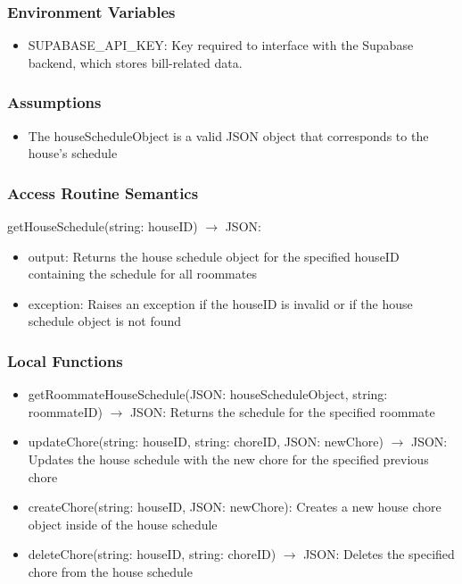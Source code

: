 \documentclass[12pt, titlepage]{article}
\begin{document}
\subsubsection{Environment Variables}
\begin{itemize}
  \item SUPABASE{\_}API{\_}KEY: Key required to interface with the Supabase backend, which stores bill-related data.
  \end{itemize}
  
\subsubsection{Assumptions}

\begin{itemize}
  \item The houseScheduleObject is a valid JSON object that corresponds to the house's schedule
\end{itemize}

\subsubsection{Access Routine Semantics}

\noindent getHouseSchedule(string: houseID) $\rightarrow$ JSON:
\begin{itemize}
\item output: Returns the house schedule object for the specified houseID containing the schedule for all roommates
\item exception: Raises an exception if the houseID is invalid or if the house schedule object is not found
\end{itemize}


\subsubsection{Local Functions}

\begin{itemize}
  \item getRoommateHouseSchedule(JSON: houseScheduleObject, string: roommateID) $\rightarrow$ JSON: Returns the schedule for the specified roommate
  \item updateChore(string: houseID, string: choreID, JSON: newChore) $\rightarrow$ JSON: Updates the house schedule with the new chore for the specified previous chore
  \item createChore(string: houseID, JSON: newChore): Creates a new house chore object inside of the house schedule
  \item deleteChore(string: houseID, string: choreID) $\rightarrow$ JSON: Deletes the specified chore from the house schedule

\end{itemize}
\end{document}
